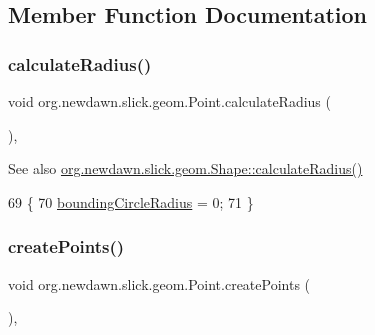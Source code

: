 \subsection{Member Function Documentation}
\mbox{\label{classorg_1_1newdawn_1_1slick_1_1geom_1_1_point_a35cb6b96446be89822bc8f88faf0502a}} 
\subsubsection{\texorpdfstring{calculate\+Radius()}{calculateRadius()}}
{\footnotesize\ttfamily void org.\+newdawn.\+slick.\+geom.\+Point.\+calculate\+Radius (\begin{DoxyParamCaption}{ }\end{DoxyParamCaption})\hspace{0.3cm}{\ttfamily [inline]}, {\ttfamily [protected]}}

\begin{DoxySeeAlso}{See also}
\mbox{\hyperlink{classorg_1_1newdawn_1_1slick_1_1geom_1_1_shape_a276adc040a678116054b860c4eb5adab}{org.\+newdawn.\+slick.\+geom.\+Shape\+::calculate\+Radius()}} 
\end{DoxySeeAlso}

\begin{DoxyCode}
69     \{ 
70         \mbox{\hyperlink{classorg_1_1newdawn_1_1slick_1_1geom_1_1_shape_ac89bf2b9c93a7294b49797fc7a054c11}{boundingCircleRadius}} = 0; 
71     \} 
\end{DoxyCode}
\mbox{\label{classorg_1_1newdawn_1_1slick_1_1geom_1_1_point_ad5e57ed805113788063eda20f406a5bd}} 
\subsubsection{\texorpdfstring{create\+Points()}{createPoints()}}
{\footnotesize\ttfamily void org.\+newdawn.\+slick.\+geom.\+Point.\+create\+Points (\begin{DoxyParamCaption}{ }\end{DoxyParamCaption})\hspace{0.3cm}{\ttfamily [inline]}, {\ttfamily [protected]}}

